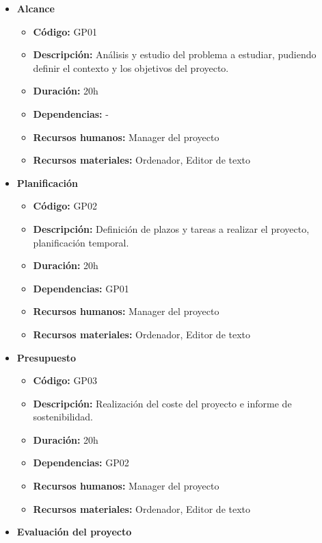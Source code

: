 \begin{itemize}
    \item \textbf{Alcance}
        \begin{itemize}
            \item \textbf{Código:} GP01
            \item \textbf{Descripción:} Análisis y estudio del problema a estudiar, pudiendo definir el contexto y los objetivos del proyecto.
            \item \textbf{Duración:} 20h
            \item \textbf{Dependencias:} -
            \item \textbf{Recursos humanos:} Manager del proyecto
            \item \textbf{Recursos materiales:} Ordenador, Editor de texto
        \end{itemize}
    \item \textbf{Planificación}
        \begin{itemize}
            \item \textbf{Código:} GP02
            \item \textbf{Descripción:} Definición de plazos y tareas a realizar el proyecto, planificación temporal.
            \item \textbf{Duración:} 20h
            \item \textbf{Dependencias:} GP01
            \item \textbf{Recursos humanos:} Manager del proyecto
            \item \textbf{Recursos materiales:} Ordenador, Editor de texto
        \end{itemize}
    \item \textbf{Presupuesto}
        \begin{itemize}
            \item \textbf{Código:} GP03
            \item \textbf{Descripción:} Realización del coste del proyecto e informe de sostenibilidad.
            \item \textbf{Duración:} 20h
            \item \textbf{Dependencias:} GP02
            \item \textbf{Recursos humanos:} Manager del proyecto
            \item \textbf{Recursos materiales:} Ordenador, Editor de texto
        \end{itemize}
    \item \textbf{Evaluación del proyecto}

\end{itemize}
